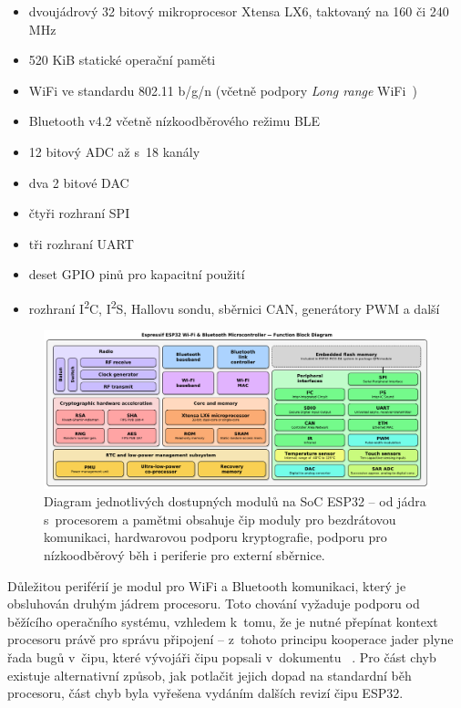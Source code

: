 \begin{itemize}
    \item dvoujádrový 32 bitový mikroprocesor Xtensa LX6, taktovaný na 160 či 240 MHz
    \item 520 KiB statické operační paměti
    \item WiFi ve standardu 802.11 b/g/n (včetně podpory \textit{Long range} WiFi~\cite{Esp32LongRangeWifi})
    \item Bluetooth v4.2 včetně nízkoodběrového režimu BLE
    \item 12 bitový ADC až s~18 kanály
    \item dva 2 bitové DAC
    \item čtyři rozhraní SPI
    \item tři rozhraní UART
    \item deset GPIO pinů pro kapacitní použití
    \item rozhraní I\textsuperscript{2}C, I\textsuperscript{2}S, Hallovu sondu, sběrnici CAN, generátory PWM a další
\end{itemize}

\begin{figure}
    \centering
    \includegraphics[width=\textwidth]{figures/esp-function-diagram.pdf}

    \caption{Diagram jednotlivých dostupných modulů na SoC ESP32 -- od jádra s~procesorem a pamětmi obsahuje čip
    moduly pro bezdrátovou komunikaci, hardwarovou podporu kryptografie, podporu pro nízkoodběrový běh i periferie
    pro externí sběrnice\protect\footnotemark.}

    \label{fig:esp-diagram}
\end{figure}

Důležitou periférií je modul pro WiFi a Bluetooth komunikaci, který je obsluhován druhým jádrem procesoru.
Toto chování vyžaduje podporu od běžícího operačního systému, vzhledem k~tomu, že je nutné přepínat kontext procesoru
právě pro správu připojení -- z~tohoto principu kooperace jader plyne řada bugů v~čipu, které vývojáři čipu
popsali v~dokumentu ~\cite{ESP32KnownBugs}.
Pro část chyb existuje alternativní způsob, jak potlačit jejich dopad na standardní běh procesoru, část
chyb byla vyřešena vydáním dalších revizí čipu ESP32.

